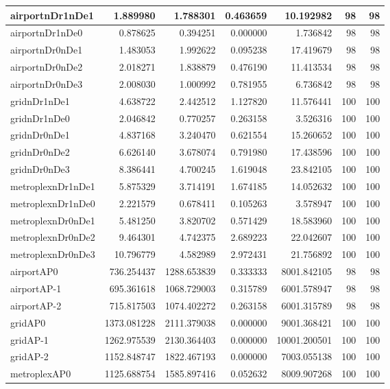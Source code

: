 \begin{longtable}{|l|r|r|r|r|r|r|}
\endlastfoot
airportnDr1nDe1 & 1.889980 & 1.788301 & 0.463659 & 10.192982 & 98 & 98 \\ \hline
airportnDr1nDe0 & 0.878625 & 0.394251 & 0.000000 & 1.736842 & 98 & 98 \\ \hline
airportnDr0nDe1 & 1.483053 & 1.992622 & 0.095238 & 17.419679 & 98 & 98 \\ \hline
airportnDr0nDe2 & 2.018271 & 1.838879 & 0.476190 & 11.413534 & 98 & 98 \\ \hline
airportnDr0nDe3 & 2.008030 & 1.000992 & 0.781955 & 6.736842 & 98 & 98 \\ \hline
gridnDr1nDe1 & 4.638722 & 2.442512 & 1.127820 & 11.576441 & 100 & 100 \\ \hline
gridnDr1nDe0 & 2.046842 & 0.770257 & 0.263158 & 3.526316 & 100 & 100 \\ \hline
gridnDr0nDe1 & 4.837168 & 3.240470 & 0.621554 & 15.260652 & 100 & 100 \\ \hline
gridnDr0nDe2 & 6.626140 & 3.678074 & 0.791980 & 17.438596 & 100 & 100 \\ \hline
gridnDr0nDe3 & 8.386441 & 4.700245 & 1.619048 & 23.842105 & 100 & 100 \\ \hline
metroplexnDr1nDe1 & 5.875329 & 3.714191 & 1.674185 & 14.052632 & 100 & 100 \\ \hline
metroplexnDr1nDe0 & 2.221579 & 0.678411 & 0.105263 & 3.578947 & 100 & 100 \\ \hline
metroplexnDr0nDe1 & 5.481250 & 3.820702 & 0.571429 & 18.583960 & 100 & 100 \\ \hline
metroplexnDr0nDe2 & 9.464301 & 4.742375 & 2.689223 & 22.042607 & 100 & 100 \\ \hline
metroplexnDr0nDe3 & 10.796779 & 4.582989 & 2.972431 & 21.756892 & 100 & 100 \\ \hline
airportAP0 & 736.254437 & 1288.653839 & 0.333333 & 8001.842105 & 98 & 98 \\ \hline
airportAP-1 & 695.361618 & 1068.729003 & 0.315789 & 6001.578947 & 98 & 98 \\ \hline
airportAP-2 & 715.817503 & 1074.402272 & 0.263158 & 6001.315789 & 98 & 98 \\ \hline
gridAP0 & 1373.081228 & 2111.379038 & 0.000000 & 9001.368421 & 100 & 100 \\ \hline
gridAP-1 & 1262.975539 & 2130.364403 & 0.000000 & 10001.200501 & 100 & 100 \\ \hline
gridAP-2 & 1152.848747 & 1822.467193 & 0.000000 & 7003.055138 & 100 & 100 \\ \hline
metroplexAP0 & 1125.688754 & 1585.897416 & 0.052632 & 8009.907268 & 100 & 100 \\ \hline

\end{longtable}
